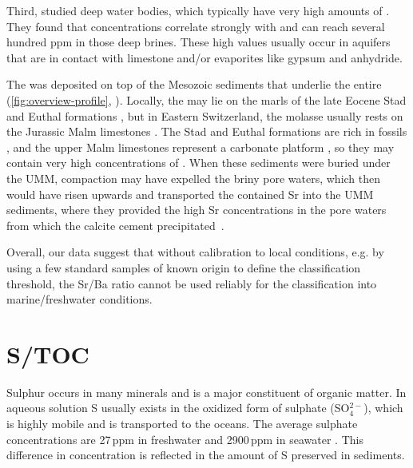 Third, \textcite{kharaka-2003} studied deep water
bodies, which typically have very high amounts of \TDS. They found that
 concentrations correlate strongly with \TDS and can reach several hundred ppm in
those deep brines. These high \TDS values usually occur in aquifers that are in contact with
limestone and/or evaporites like gypsum and anhydride.

The \UMM was deposited on top of the Mesozoic sediments that underlie the entire \SMB 
(\cref{fig:overview-profile}, \textcite{helvetic-map}). Locally, the \UMM may lie on the
marls of the late Eocene Stad and Euthal formations \parencite{Ibergeregg_Text}, but in Eastern
Switzerland, the molasse usually rests on the Jurassic Malm limestones \parencite{chevalier-molasse-2010}.
The Stad and Euthal formations are rich in fossils \parencite{Einsiedeln_Text}, 
and the upper Malm limestones represent a carbonate platform \parencite{chevalier-molasse-2010}, 
so they may contain very high concentrations of 
. When these sediments were buried under the UMM, compaction may have expelled the briny pore waters,
which then would have risen upwards and transported the contained Sr into the UMM sediments, where they
provided the high
Sr concentrations in the pore waters from which the calcite cement precipitated~\parencite{kharaka-2003}.

%     

Overall, our data suggest that without calibration to local conditions, e.g. by using a few standard samples
of known origin to define the classification threshold, the Sr/Ba ratio cannot be used reliably for the classification
into marine/freshwater conditions. 

\section{S/TOC}

Sulphur occurs in many minerals and is a major constituent of organic matter.
In aqueous solution S usually exists in the oxidized form of sulphate (SO$_4^{2-}$), which is
highly mobile and is transported to the oceans. The average sulphate concentrations are
27\,ppm in freshwater and 2900\,ppm in seawater \parencite{wei-2020}.
This difference in concentration is reflected in the amount of S preserved in sediments.

